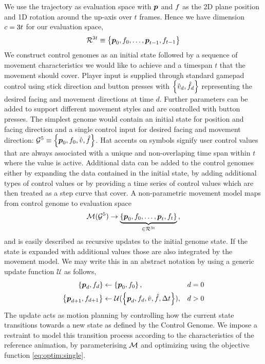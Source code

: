 We use the trajectory as evaluation space with $\boldsymbol{p }$ and $f$ as the 2D plane position and 1D rotation around the up-axis over $t$ frames. Hence we have dimension $c = 3 t$ for our evaluation space,
\begin{align}
\mathcal{R}^{3 t} 
\equiv 
\left\{
    \boldsymbol{p }_0,f_0,
    \ldots,
    \boldsymbol{p }_{t-1},f_{t-1}
    \right\}
\end{align}
We construct control genomes as an initial state followed by a sequence of movement characteristics we would like to achieve and a timespan $t$ that the movement should cover. Player input is supplied through standard gamepad control using stick direction and button presses with $\left\{ \hat{v}_d, \hat{f}_d \right\}$ representing the desired facing and movement directions at time $d$. Further parameters can be added to support different movement styles and are controlled with button presses. The simplest genome would contain an initial state for position and facing direction and a single control input for desired facing and movement direction: $\mathcal{G}^5 \equiv \left\{ \boldsymbol{p }_0,f_0,\hat{v},\hat{f} \right\}$. Hat accents on symbols signify user control values that are always associated with a unique and non-overlaping time span within $t$ where the value is active. Additional data can be added to the control genomes either by expanding the data contained in the initial state, by adding additional types of control values or by providing a time series of control values which are then treated as a step curve that cover. A non-parametric movement model maps from control genome to evaluation space
\begin{equation}
    \mathcal{M}(\mathcal{G}^5)
    \rightarrow
    \underbrace{
    \left\{
    \boldsymbol{p }_0,f_0,\ldots,\boldsymbol{p }_{t},f_{t}\right\}
    }_{\in \mathcal{R}^{3t}}
    \,,
\end{equation}
and is easily described as recursive updates to the initial genome state. If the state is expanded with additional values those are also integrated by the movement model. 
We may write this in an abstract notation by using a generic update function $\mathcal{U}$ as follows,
\begin{subequations}
\begin{align}
    \left\{
    \boldsymbol{p }_d,f_d
    \right\}
    &\leftarrow
    \left\{
    \boldsymbol{p }_0,f_0    
    \right\},&d=0
    \\
    \left\{
    \boldsymbol{p }_{d+1},f_{d+1}
    \right\}
    &\leftarrow
    \mathcal{U}
    (
    \left\{
    \boldsymbol{p }_d,f_d,
    \hat{v},
    \hat{f},
    \Delta{t}
    \right\}
    )
    \label{eq:move:update},&d>0
\end{align}
\end{subequations}
The update acts as motion planning by controlling how the current state transitions towards a new state as defined by the Control Genome. We impose a restraint to model this transition process according to the characteristics of the reference animation, by parameterising $\mathcal{M}$ and optimizing using the objective function \eqref{eq:optim:single}. 

